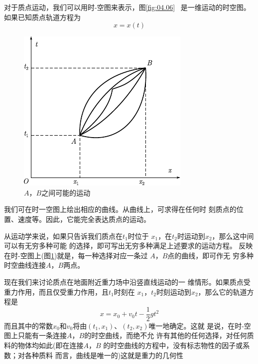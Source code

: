 对于质点运动，我们可以用时-空图来表示，图\ref{fig:04.06}~
是一维运动的时空图。如果已知质点轨道方程为
\begin{equation*}
	x = x ( t ) 
\end{equation*}
\begin{figure}
	\vspace{-1em}
	\centering
	\includegraphics{figure/fig04.07}
	\caption{$ A $，$ B $之间可能的运动}
	\label{fig:04.07}
\end{figure}
我们可在时一空图上绘出相应的曲线。从曲线上，可求得在任何时
刻质点的位置、速度等。因此，它能完全表达质点的运动。

从运动学来说，如果只告诉我们质点在$ t_1 $时位于
$ x_1 $，在$ t_2 $时运动到$ x_2 $，那么这中间可以有无穷多种可能
的选择，即可写出无穷多种满足上述要求的运动方程。
反映在时-空图上(图\ref{fig:04.07})就是，每一种选择对应一条过
$ A $，$ B $点的曲线，即可作无
穷多种时空曲线连接$ A $，$ B $两点。

现在我们来讨论质点在地面附近重力场中沿竖直线运动的一
维情形。如果质点受重力作用，而且仅受重力作用，且$  t _ { 1 }   $时刻在
$ x _ { 1 }   $，$  t _ { 2 }   $时刻运动到$  x _ { 2 }   $，那么它的轨道方程是
\begin{equation*}
	x = x _ { 0 } + v _ { 0 } t - \frac { 1 } { 2 } g t ^ { 2 }  
\end{equation*}
而且其中的常数$ x _ { 0 } $和$  v _ { 0 }  $将由$  ( t _ { 1 }, x _ { 1 } )   $、$  ( t _ { 2 } , x _ { 2 } )   $唯一地确定。这就
是说，在时-空图上只能有一条连接$ A $，$ B $的时空曲线，而绝不允
许有其他的任何选择，对任何质料的物体均如此(即在连接$ A $，$ B $
的时空曲线的方程中，没有标志物性的因子或系数；对各种质料
而言，曲线是唯一的)这就是重力的几何性

